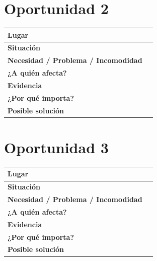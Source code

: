 \documentclass[12pt,a4paper]{article}
\begin{document}
	\vspace{0.15cm}
	
	\section*{Oportunidad 2}
	
	\begin{center}
		\small
		\begin{tabular}{|L{0.22\textwidth}|L{0.61\textwidth}|}
			\hline
			\textbf{Lugar} & \rule{0pt}{0.5cm} \\
			\hline
			\textbf{Situación} & \rule{0pt}{0.5cm} \\
			\hline
			\textbf{Necesidad / Problema / Incomodidad} & \rule{0pt}{0.5cm} \\
			\hline
			\textbf{¿A quién afecta?} & \rule{0pt}{0.45cm} \\
			\hline
			\textbf{Evidencia} & \rule{0pt}{0.6cm} \\
			\hline
			\textbf{¿Por qué importa?} & \rule{0pt}{0.5cm} \\
			\hline
			\textbf{Posible solución} & \rule{0pt}{0.45cm} \\
			\hline
		\end{tabular}
	\end{center}
	
	\vspace{0.15cm}
	
	\section*{Oportunidad 3}
	
	\begin{center}
		\small
		\begin{tabular}{|L{0.22\textwidth}|L{0.61\textwidth}|}
			\hline
			\textbf{Lugar} & \rule{0pt}{0.5cm} \\
			\hline
			\textbf{Situación} & \rule{0pt}{0.5cm} \\
			\hline
			\textbf{Necesidad / Problema / Incomodidad} & \rule{0pt}{0.5cm} \\
			\hline
			\textbf{¿A quién afecta?} & \rule{0pt}{0.45cm} \\
			\hline
			\textbf{Evidencia} & \rule{0pt}{0.6cm} \\
			\hline
			\textbf{¿Por qué importa?} & \rule{0pt}{0.5cm} \\
			\hline
			\textbf{Posible solución} & \rule{0pt}{0.45cm} \\
			\hline
		\end{tabular}
	\end{center}
	
\end{document}
